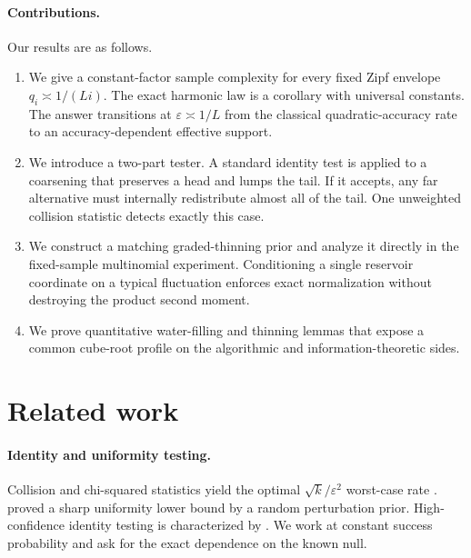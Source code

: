 \documentclass{article}
\newcommand{\1}{\mathbf 1}
\begin{document}
\paragraph{Contributions.}
Our results are as follows.
\begin{enumerate}[leftmargin=*,itemsep=2pt,topsep=3pt]
\item We give a constant-factor sample complexity for every fixed Zipf
envelope $q_i\asymp1/(Li)$. The exact harmonic law is a corollary with universal constants. The answer transitions at $\varepsilon\asymp1/L$ from the classical quadratic-accuracy rate to an accuracy-dependent effective support.
\item We introduce a two-part tester. A standard identity test is applied to
a coarsening that preserves a head and lumps the tail. If it accepts, any far alternative must internally redistribute almost all of the tail. One unweighted collision statistic detects exactly this case.
\item We construct a matching graded-thinning prior and analyze it directly
in the fixed-sample multinomial experiment. Conditioning a single reservoir coordinate on a typical fluctuation enforces exact normalization without destroying the product second moment.
\item We prove quantitative water-filling and thinning lemmas that expose a
common cube-root profile on the algorithmic and information-theoretic sides.
\end{enumerate}

\section{Related work}

\paragraph{Identity and uniformity testing.}
Collision and chi-squared statistics yield the optimal $\sqrt{k}/\varepsilon^2$ worst-case rate \citep{goldreich2017property,canonne2020survey,canonne2022topics}. \citet{paninski2008coincidence} proved a sharp uniformity lower bound by a random perturbation prior. High-confidence identity testing is characterized by \citet{diakonikolas2018highprob}. We work at constant success probability and ask for the exact dependence on the known null.
\end{document}
